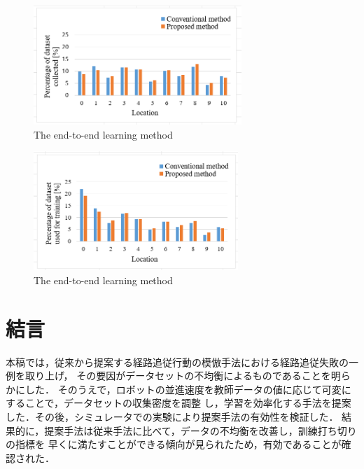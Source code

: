 \documentclass{jarticle}
\begin{document}
\begin{figure}[h!]
  \centering
   \includegraphics[height=45mm]{./png/dataset_pro2.png}
   \caption{The end-to-end learning method}
\end{figure}

\begin{figure}[h!]
  \centering
   \includegraphics[height=45mm]{./png/gaku_pro2.png}
   \caption{The end-to-end learning method}
\end{figure}

\section{結言}
本稿では，従来から提案する経路追従行動の模倣手法における経路追従失敗の一例を取り上げ，
その要因がデータセットの不均衡によるものであることを明らかにした．
そのうえで，ロボットの並進速度を教師データの値に応じて可変にすることで，データセットの収集密度を調整
し，学習を効率化する手法を提案した．その後，シミュレータでの実験により提案手法の有効性を検証した．
結果的に，提案手法は従来手法に比べて，データの不均衡を改善し，訓練打ち切りの指標を
早くに満たすことができる傾向が見られたため，有効であることが確認された．
\end{document}
